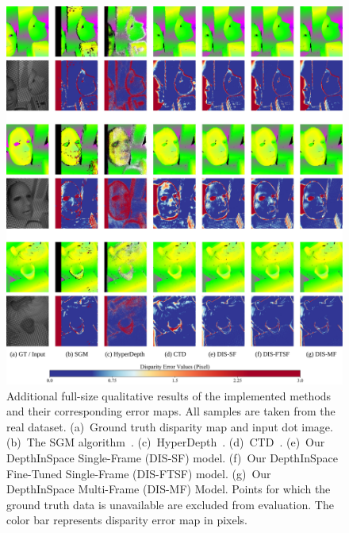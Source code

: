 \begin{figure}
    \begin{center}
        \includegraphics[width=1\linewidth]{images/chapter2/supp_figures/supp_results_4.jpg}
    \end{center}
   \caption{Additional full-size qualitative results of the implemented methods and their corresponding error maps. All samples are taken from the real dataset. (a)~Ground truth disparity map and input dot image. (b)~The SGM algorithm~\citep{hirschmuller2007stereo}. (c)~HyperDepth~\citep{ryan2016hyperdepth}. (d)~CTD~\citep{riegler2019connecting}. (e)~Our DepthInSpace Single-Frame (DIS-SF) model. (f)~Our DepthInSpace Fine-Tuned Single-Frame (DIS-FTSF) model. (g)~Our DepthInSpace Multi-Frame (DIS-MF) Model. Points for which the ground truth data is unavailable are excluded from evaluation. The color bar represents disparity error map in pixels.}
    \label{fig:c2_real_results}
\end{figure}

